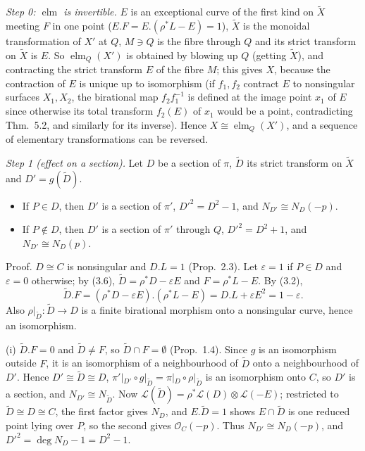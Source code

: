 \documentclass[11pt]{article}
\begin{document}
\emph{Step 0: $\operatorname{elm}$ is invertible.} $E$ is an exceptional curve of the first kind on $\widetilde X$ meeting $F$ in one point ($E.F=E.(\rho^*L-E)=1$), $\widetilde X$ is the monoidal transformation of $X'$ at $Q$, $M\ni Q$ is the fibre through $Q$ and its strict transform on $\widetilde X$ is $E$. So $\operatorname{elm}_Q(X')$ is obtained by blowing up $Q$ (getting $\widetilde X$), and contracting the strict transform $E$ of the fibre $M$; this gives $X$, because the contraction of $E$ is unique up to isomorphism (if $f_1,f_2$ contract $E$ to nonsingular surfaces $X_1,X_2$, the birational map $f_2f_1^{-1}$ is defined at the image point $x_1$ of $E$ since otherwise its total transform $f_2(E)$ of $x_1$ would be a point, contradicting Thm.~5.2, and similarly for its inverse). Hence $X\cong\operatorname{elm}_Q(X')$, and a sequence of elementary transformations can be reversed.

\emph{Step 1 (effect on a section).} Let $D$ be a section of $\pi$, $\widetilde D$ its strict transform on $\widetilde X$ and $D'=g(\widetilde D)$.
\begin{itemize}
\item[(i)] If $P\in D$, then $D'$ is a section of $\pi'$, $D'^2=D^2-1$, and $N_{D'}\cong N_D(-p)$.
\item[(ii)] If $P\notin D$, then $D'$ is a section of $\pi'$ through $Q$, $D'^2=D^2+1$, and $N_{D'}\cong N_D(p)$.
\end{itemize}
Proof. $D\cong C$ is nonsingular and $D.L=1$ (Prop.~2.3). Let $\varepsilon=1$ if $P\in D$ and $\varepsilon=0$ otherwise; by (3.6), $\widetilde D=\rho^*D-\varepsilon E$ and $F=\rho^*L-E$. By (3.2),
\[
\widetilde D.F=(\rho^*D-\varepsilon E).(\rho^*L-E)=D.L+\varepsilon E^2=1-\varepsilon .
\]
Also $\rho|_{\widetilde D}:\widetilde D\to D$ is a finite birational morphism onto a nonsingular curve, hence an isomorphism.

(i) $\widetilde D.F=0$ and $\widetilde D\ne F$, so $\widetilde D\cap F=\emptyset$ (Prop.~1.4). Since $g$ is an isomorphism outside $F$, it is an isomorphism of a neighbourhood of $\widetilde D$ onto a neighbourhood of $D'$. Hence $D'\cong\widetilde D\cong D$, $\pi'|_{D'}\circ g|_{\widetilde D}=\pi|_D\circ\rho|_{\widetilde D}$ is an isomorphism onto $C$, so $D'$ is a section, and $N_{D'}\cong N_{\widetilde D}$. Now $\mathcal L(\widetilde D)=\rho^*\mathcal L(D)\otimes\mathcal L(-E)$; restricted to $\widetilde D\cong D\cong C$, the first factor gives $N_D$, and $E.\widetilde D=1$ shows $E\cap\widetilde D$ is one reduced point lying over $P$, so the second gives $\mathcal O_C(-p)$. Thus $N_{D'}\cong N_D(-p)$, and $D'^2=\deg N_D-1=D^2-1$.
\end{document}
